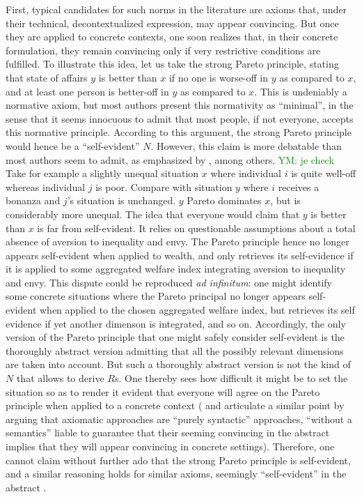 \documentclass[preprint, french, english, 11pt, authoryear]{elsarticle}%
\newcommand{\commentYM}[1]{\textcolor{green}{YM: #1}}
\begin{document}
First, typical candidates for such norms in the literature are axioms that, under their technical, decontextualized expression, may appear convincing. But once they are applied to concrete contexts, one soon realizes that, in their concrete formulation, they remain convincing only if very restrictive conditions are fulfilled. To illustrate this idea, let us take the strong Pareto principle, stating that state of affairs $y$ is better than $x$ if no one is worse-off in $y$ as compared to $x$, and at least one person is better-off in $y$ as compared to $x$. This is undeniably a normative axiom, but most authors present this normativity as “minimal”, in the sense that it seems innocuous to admit that most people, if not everyone, accepts this normative principle. According to this argument, the strong Pareto principle would hence be a “self-evident” $N$. However, this claim is more debatable than most authors seem to admit, as emphasized by \cite{sen_rationality_2004}, among others. \commentYM{je check} Take for example a slightly unequal situation $x$ where individual $i$ is quite well-off whereas individual $j$ is poor. Compare with situation $y$ where $i$ receives a bonanza and $j$'s situation is unchanged. $y$ Pareto dominates $x$, but is considerably more unequal. The idea that everyone would claim that $y$ is better than $x$ is far from self-evident. It relies on questionable assumptions about a total absence of aversion to inequality and envy. The Pareto principle hence no longer appears self-evident when applied to wealth, and only retrieves its self-evidence if it is applied to some aggregated welfare index integrating aversion to inequality and envy. This dispute could be reproduced \emph{ad infinitum}: one might identify some concrete situations where the Pareto principal no longer appears self-evident when applied to the chosen aggregated welfare index, but retrieves its self evidence if yet another dimenson is integrated, and so on. Accordingly, the only version of the Pareto principle that one might safely consider self-evident is the thoroughly abstract version admitting that all the possibly relevant dimensions are taken into account. But such a thoroughly abstract version is not the kind of $N$ that allows to derive $R$s. One thereby sees how difficult it might be to set the situation so as to render it evident that everyone will agree on the Pareto principle when applied to a concrete context (\citet{mongin_axiomatisation_2003} and \citet{baujard_bien-etre_2015} articulate a similar point by arguing that axiomatic approaches are “purely syntactic” approaches, “without a semantics” liable to guarantee that their seeming convincing in the abstract implies that they will appear convincing in concrete settings). Therefore, one cannot claim without further ado that the strong Pareto principle is self-evident, and a similar reasoning holds for similar axioms, seemingly “self-evident” in the abstract \citep{sen_maximization_1997}.
\end{document}
